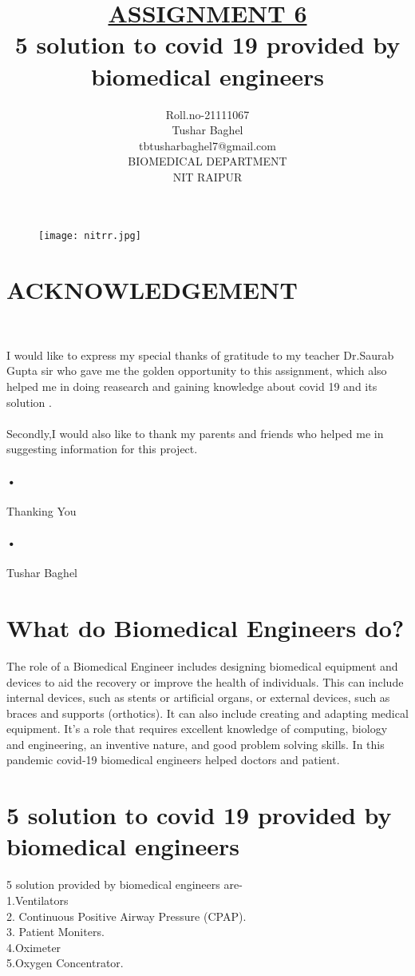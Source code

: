 \documentclass[12pt]{report}
\title{\underline{ASSIGNMENT 6} \\
5 solution to covid 19 provided by biomedical engineers  }
\author{Roll.no-21111067\\Tushar Baghel\\tbtusharbaghel7@gmail.com\\BIOMEDICAL DEPARTMENT\\NIT RAIPUR\\}
\begin{document}
\begin{figure}
\centering
\texttt{[image: nitrr.jpg]}
\end{figure}
\maketitle
\clearpage
\tableofcontents
\clearpage

\section{ACKNOWLEDGEMENT}\


I would like to express my special thanks of gratitude to my teacher Dr.Saurab Gupta sir who gave me the golden opportunity to this assignment, which also helped me in doing reasearch and gaining knowledge about covid 19 and its solution .\paragraph{}

Secondly,I would also like to thank my parents and friends who helped me in suggesting information for this project.\paragraph{•}


Thanking You\paragraph{•}

Tushar Baghel 

\clearpage

\section{What do Biomedical Engineers do?}
The role of a Biomedical Engineer includes designing biomedical equipment and devices to aid the recovery or improve the health of individuals. This can include internal devices, such as stents or artificial organs, or external devices, such as braces and supports (orthotics). It can also include creating and adapting medical equipment. It’s a role that requires excellent knowledge of computing, biology and engineering, an inventive nature, and good problem solving skills.
In this pandemic covid-19 biomedical engineers helped doctors and patient.

\section{5 solution to covid 19 provided by biomedical engineers}
5 solution provided by biomedical engineers are-\\
1.Ventilators\\
2. Continuous Positive Airway Pressure (CPAP).\\
3. Patient Moniters.\\
4.Oximeter\\
5.Oxygen Concentrator.\\
\end{document}

